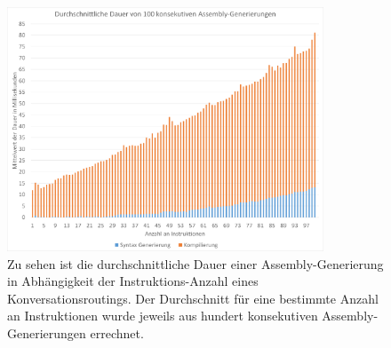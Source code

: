 \begin{figure} %
	\centering
		\includegraphics[width=0.84\textwidth]{img/AverageTimeDiagram.png}
	\caption[Durchschnittliche Dauer von Assembly-Generierungen]{Zu sehen ist die durchschnittliche Dauer einer Assembly-Generierung in Abhängigkeit der Instruktions-Anzahl eines Konversationsroutings. Der Durchschnitt für eine bestimmte Anzahl an Instruktionen wurde jeweils aus hundert konsekutiven Assembly-Generierungen errechnet.}
	\label{fig:AverageTimeDiagram}
\end{figure}